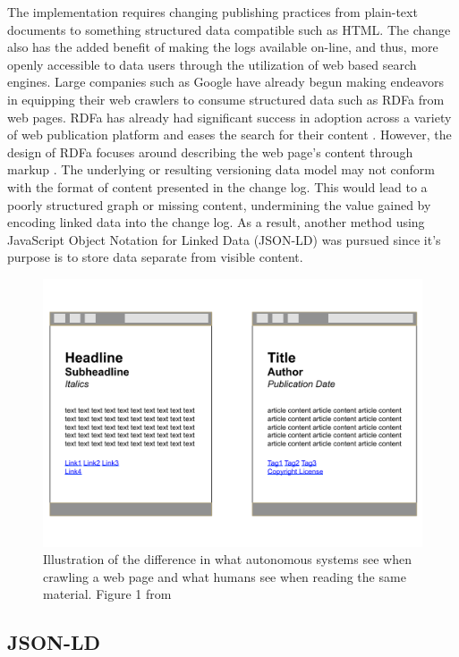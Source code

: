 The implementation requires changing publishing practices from plain-text documents to something structured data compatible such as HTML.
The change also has the added benefit of making the logs available on-line, and thus, more openly accessible to data users through the utilization of web based search engines.
Large companies such as Google have already begun making endeavors in equipping their web crawlers to consume structured data such as RDFa from web pages.
RDFa has already had significant success in adoption across a variety of web publication platform and eases the search for their content \cite{Bizer2013}.
However, the design of RDFa focuses around describing the web page's content through markup \cite{Herman2015}.
The underlying or resulting versioning data model may not conform with the format of content presented in the change log.
This would lead to a poorly structured graph or missing content, undermining the value gained by encoding linked data into the change log.
As a result, another method using JavaScript Object Notation for Linked Data (JSON-LD) was pursued since it's purpose is to store data separate from visible content.

\begin{figure}
	\centering
	\includegraphics[scale=0.40]{figures/RDFaSemantics.png}
	\caption{Illustration of the difference in what autonomous systems see when crawling a web page and what humans see when reading the same material. Figure 1 from \cite{Herman2015}}
	\label{RDFa}
\end{figure}

\subsection{JSON-LD}

